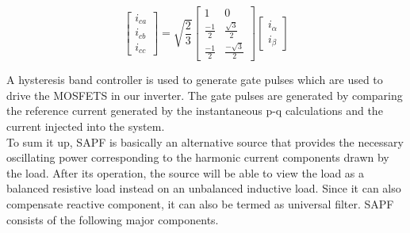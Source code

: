 \documentclass[journal,twoside]{IEEEtran}
\begin{document}
\[ \begin{bmatrix} i_{ca} \\ i_{cb} \\i_{cc} \end{bmatrix}
=\sqrt{\frac{2}{3}} \begin{bmatrix} 1 & 0\\ \frac{-1}{2} & \frac{\sqrt 3}{2}\\ \frac{-1}{2} & \frac{-\sqrt 3}{2} \end{bmatrix} \begin{bmatrix} i_{\alpha} \\ i_{\beta} \end{bmatrix} \] 

A hysteresis band controller is used to generate gate
pulses which are used to drive the MOSFETS in our inverter.
The gate pulses are generated by comparing the reference
current generated by the instantaneous p-q calculations and
the current injected into the system.\\
To sum it up, SAPF is basically an alternative source that
provides the necessary oscillating power corresponding to the
harmonic current components drawn by the load. After its
operation, the source will be able to view the load as a
balanced resistive load instead on an unbalanced inductive
load. Since it can also compensate reactive component, it can
also be termed as universal filter. SAPF consists of the
following major components.
\end{document}
